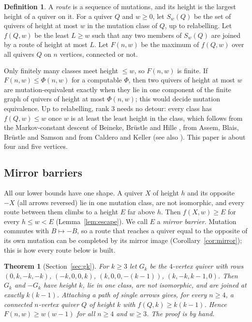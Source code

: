 \documentclass[11pt]{amsart}
\newtheorem{mainthm}{Theorem}
\theoremstyle{definition}
\newtheorem{definition}[theorem]{Definition}
\theoremstyle{remark}
\begin{document}
\begin{definition}\label{def:f}
A \emph{route} is a sequence of mutations, and its height is the largest height of a quiver on it. For a quiver $Q$ and $w\ge 0$, let $S_w(Q)$ be the set of quivers of height at most $w$ in the mutation class of $Q$, up to relabelling. Let $f(Q,w)$ be the least $L\ge w$ such that any two members of $S_w(Q)$ are joined by a route of height at most $L$. Let $F(n,w)$ be the maximum of $f(Q,w)$ over all quivers $Q$ on $n$ vertices, connected or not.
\end{definition}

Only finitely many classes meet height $\le w$, so $F(n,w)$ is finite. If $F(n,w)\le\Phi(n,w)$ for a computable $\Phi$, then two quivers of height at most $w$ are mutation-equivalent exactly when they lie in one component of the finite graph of quivers of height at most $\Phi(n,w)$; this would decide mutation equivalence. Up to relabelling, rank $3$ needs no detour: every class has $f(Q,w)\le w$ once $w$ is at least the least height in the class, which follows from the Markov-constant descent of Beineke, Br\"ustle and Hille \cite{BBH}, from Assem, Blais, Br\"ustle and Samson \cite{ABBS} and from Caldero and Keller \cite{CK} (see also \cite[\S3]{FN-long}). This paper is about four and five vertices.

\subsection{Mirror barriers}
All our lower bounds have one shape. A quiver $X$ of height $h$ and its opposite $-X$ (all arrows reversed) lie in one mutation class, are not isomorphic, and every route between them climbs to a height $E$ far above $h$. Then $f(X,w)\ge E$ for every $h\le w<E$ (Lemma~\ref{lem:escape}). We call $E$ a \emph{mirror barrier}. Mutation commutes with $B\mapsto -B$, so a route that reaches a quiver equal to the opposite of its own mutation can be completed by its mirror image (Corollary~\ref{cor:mirror}); this is how every route below is built.

\begin{mainthm}[Section~\ref{sec:gk}]\label{thmA}
For $k\ge3$ let $G_k$ be the $4$-vertex quiver with rows $(0,k,-k,-k)$, $(-k,0,0,k)$, $(k,0,0,-(k-1))$, $(k,-k,k-1,0)$. Then $G_k$ and $-G_k$ have height $k$, lie in one class, are not isomorphic, and are joined at exactly $k(k-1)$. Attaching a path of single arrows gives, for every $n\ge4$, a connected $n$-vertex quiver $Q$ of height $k$ with $f(Q,k)\ge k(k-1)$. Hence $F(n,w)\ge w(w-1)$ for all $n\ge4$ and $w\ge3$. The proof is by hand.
\end{mainthm}
\end{document}
